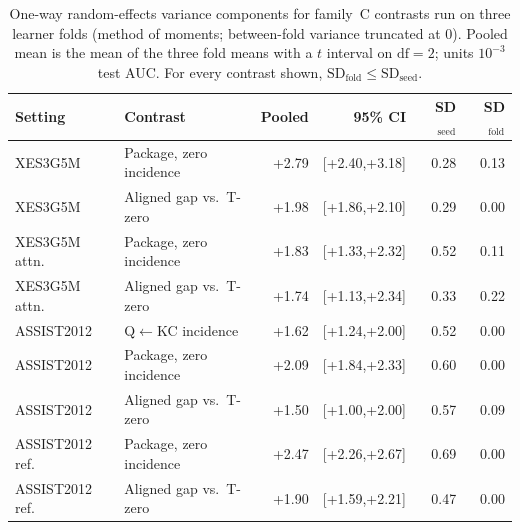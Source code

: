\begin{table}[tbp]
\caption{One-way random-effects variance components for family~C
contrasts run on three learner folds (method of moments;
between-fold variance truncated at 0). Pooled mean is the mean of
the three fold means with a $t$ interval on $\mathrm{df}{=}2$; units
$10^{-3}$ test AUC. For every contrast shown,
$\mathrm{SD}_{\mathrm{fold}}\le\mathrm{SD}_{\mathrm{seed}}$.}
\label{tab:credit-primary-var}
\centering
\scriptsize
\begin{tabular}{@{}llrrrr@{}}
\toprule
Setting & Contrast & Pooled & 95\% CI & SD$_{\mathrm{seed}}$ & SD$_{\mathrm{fold}}$ \\
\midrule
XES3G5M & Package, zero incidence & +2.79 & [+2.40,+3.18] & 0.28 & 0.13 \\
XES3G5M & Aligned gap vs.\ T-zero & +1.98 & [+1.86,+2.10] & 0.29 & 0.00 \\
XES3G5M attn. & Package, zero incidence & +1.83 & [+1.33,+2.32] & 0.52 & 0.11 \\
XES3G5M attn. & Aligned gap vs.\ T-zero & +1.74 & [+1.13,+2.34] & 0.33 & 0.22 \\
ASSIST2012 & Q$\leftarrow$KC incidence & +1.62 & [+1.24,+2.00] & 0.52 & 0.00 \\
ASSIST2012 & Package, zero incidence & +2.09 & [+1.84,+2.33] & 0.60 & 0.00 \\
ASSIST2012 & Aligned gap vs.\ T-zero & +1.50 & [+1.00,+2.00] & 0.57 & 0.09 \\
ASSIST2012 ref. & Package, zero incidence & +2.47 & [+2.26,+2.67] & 0.69 & 0.00 \\
ASSIST2012 ref. & Aligned gap vs.\ T-zero & +1.90 & [+1.59,+2.21] & 0.47 & 0.00 \\
\bottomrule
\end{tabular}
\end{table}
